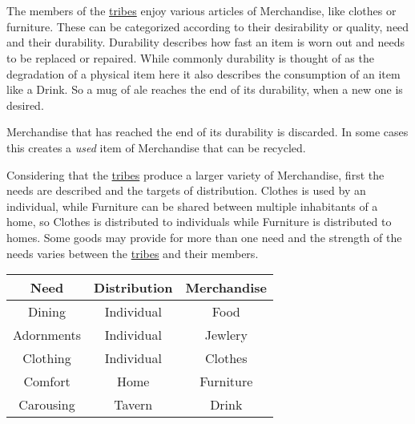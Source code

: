 \section{}\label{ch:Goods:Merchandise}

The members of the \hyperref[ch:Tribes]{tribes} enjoy various articles of
\gls*{Merchandise}, like clothes or furniture. These can be categorized
according to their desirability or quality, need and their durability.
Durability describes how fast an item is worn out and needs to be replaced or
repaired. While commonly durability is thought of as the degradation of a
physical item here it also describes the consumption of an item like a
\gls{Drink}. So a mug of ale reaches the end of its durability, when a new one
is desired.

\Gls{Merchandise} that has reached the end of its durability is discarded.
In some cases this creates a \emph{used} item of \gls{Merchandise} that can be recycled.

Considering that the \hyperref[ch:Tribes]{tribes} produce a larger variety of
\gls*{Merchandise}, first the needs are described and the targets of
distribution. \Gls{Clothes} is used by an individual, while \gls{Furniture} can
be shared between multiple inhabitants of a home, so \Gls{Clothes} is
distributed to individuals while \gls{Furniture} is distributed to homes. Some
goods may provide for more than one need and the strength of the needs varies
between the \hyperref[ch:Tribes]{tribes} and their members.

\begin{longtable}{ccc}
	\toprule
	Need             & Distribution & \Gls{Merchandise} \\
	\midrule
	\Gls{Dining}     & Individual   & \Gls{Food}        \\
	\Gls{Adornments} & Individual   & \Gls{Jewlery}     \\
	\Gls{Clothing}   & Individual   & \Gls{Clothes}     \\
	\Gls{Comfort}    & Home         & \Gls{Furniture}   \\
	\Gls{Carousing}  & Tavern       & \Gls{Drink}       \\
	\bottomrule
\end{longtable}

\subsection{}\label{ch:Goods:Merchandise:Jewlery}

